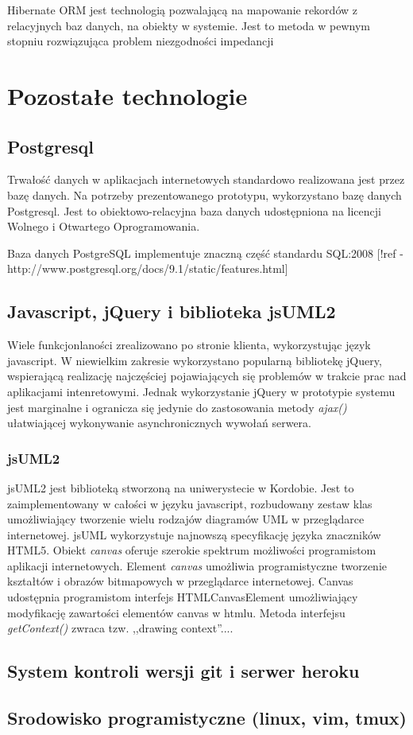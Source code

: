       Hibernate ORM jest technologią pozwalającą na mapowanie rekordów z relacyjnych baz danych, na obiekty w systemie. Jest to metoda w pewnym stopniu rozwiązująca problem niezgodności impedancji \cite{KSub01}

  \section{Pozostałe technologie}
    \subsection{Postgresql}
      Trwałość danych w aplikacjach internetowych standardowo realizowana jest przez bazę danych. Na potrzeby prezentowanego prototypu, wykorzystano bazę danych Postgresql. Jest to obiektowo-relacyjna baza danych udostępniona na licencji Wolnego i Otwartego Oprogramowania. 

      Baza danych PostgreSQL implementuje znaczną część standardu SQL:2008 [!ref - http://www.postgresql.org/docs/9.1/static/features.html]

    \subsection{Javascript, jQuery i biblioteka jsUML2}

      Wiele funkcjonlaności zrealizowano po stronie klienta, wykorzystując język javascript. W niewielkim zakresie wykorzystano popularną bibliotekę jQuery, wspierającą realizację najczęściej pojawiających się problemów w trakcie prac nad aplikacjami intenretowymi. Jednak wykorzystanie jQuery w prototypie systemu jest marginalne i ogranicza się jedynie do zastosowania metody \emph{ajax()} ułatwiającej wykonywanie asynchronicznych wywołań serwera.

      \subsubsection{jsUML2}
        jsUML2 jest biblioteką stworzoną na uniwerystecie w Kordobie. Jest to zaimplementowany w całości w języku javascript, rozbudowany zestaw klas umożliwiający tworzenie wielu rodzajów diagramów UML w przeglądarce internetowej. jsUML wykorzystuje najnowszą specyfikację języka znaczników HTML5. Obiekt \emph{canvas} oferuje szerokie spektrum możliwości programistom aplikacji internetowych. Element \emph{canvas} umożliwia programistyczne tworzenie kształtów i obrazów bitmapowych w przeglądarce internetowej. Canvas udostępnia programistom interfejs HTMLCanvasElement umożliwiający modyfikację zawartości elementów canvas w htmlu. Metoda interfejsu \emph{getContext()} zwraca tzw. ,,drawing context''.... 
        
      
       
    \subsection{System kontroli wersji git i serwer heroku}
    \subsection{Srodowisko programistyczne (linux, vim, tmux)}
